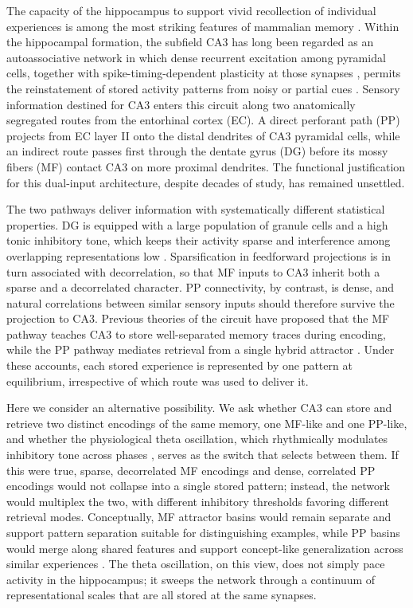 \documentclass[11pt]{article}
\begin{document}
The capacity of the hippocampus to support vivid recollection of individual
experiences is among the most striking features of mammalian memory
\cite{scoville1957loss}. Within the hippocampal formation, the subfield CA3
has long been regarded as an autoassociative network in which dense recurrent
excitation among pyramidal cells, together with spike-timing-dependent
plasticity at those synapses \cite{bi1998synaptic}, permits the reinstatement
of stored activity patterns from noisy or partial cues
\cite{mcnaughton1987hippocampal,hopfield1982neural}. Sensory information
destined for CA3 enters this circuit along two anatomically segregated routes
from the entorhinal cortex (EC). A direct perforant path (PP) projects from
EC layer II onto the distal dendrites of CA3 pyramidal cells, while an
indirect route passes first through the dentate gyrus (DG) before its mossy
fibers (MF) contact CA3 on more proximal dendrites. The functional
justification for this dual-input architecture, despite decades of study,
has remained unsettled.

The two pathways deliver information with systematically different statistical
properties. DG is equipped with a large population of granule cells and a
high tonic inhibitory tone, which keeps their activity sparse and interference
among overlapping representations low \cite{engin2015tonic,leutgeb2007pattern}.
Sparsification in feedforward projections is in turn associated with
decorrelation, so that MF inputs to CA3 inherit both a sparse and a
decorrelated character. PP connectivity, by contrast, is dense, and natural
correlations between similar sensory inputs should therefore survive the
projection to CA3. Previous theories of the circuit have proposed that the
MF pathway teaches CA3 to store well-separated memory traces during
encoding, while the PP pathway mediates retrieval from a single hybrid
attractor \cite{treves1992computational,mcclelland1995why}. Under these
accounts, each stored experience is represented by one pattern at
equilibrium, irrespective of which route was used to deliver it.

Here we consider an alternative possibility. We ask whether CA3 can store
and retrieve two distinct encodings of the same memory, one MF-like and one
PP-like, and whether the physiological theta oscillation, which rhythmically
modulates inhibitory tone across phases \cite{tsodyks1996population}, serves
as the switch that selects between them. If this were true, sparse,
decorrelated MF encodings and dense, correlated PP encodings would not
collapse into a single stored pattern; instead, the network would multiplex
the two, with different inhibitory thresholds favoring different retrieval
modes. Conceptually, MF attractor basins would remain separate and support
pattern separation suitable for distinguishing examples, while PP basins
would merge along shared features and support concept-like generalization
across similar experiences
\cite{quiroga2005invariant,knowlton1993learning,zeithamova2019brain}. The
theta oscillation, on this view, does not simply pace activity in the
hippocampus; it sweeps the network through a continuum of representational
scales that are all stored at the same synapses.
\end{document}
